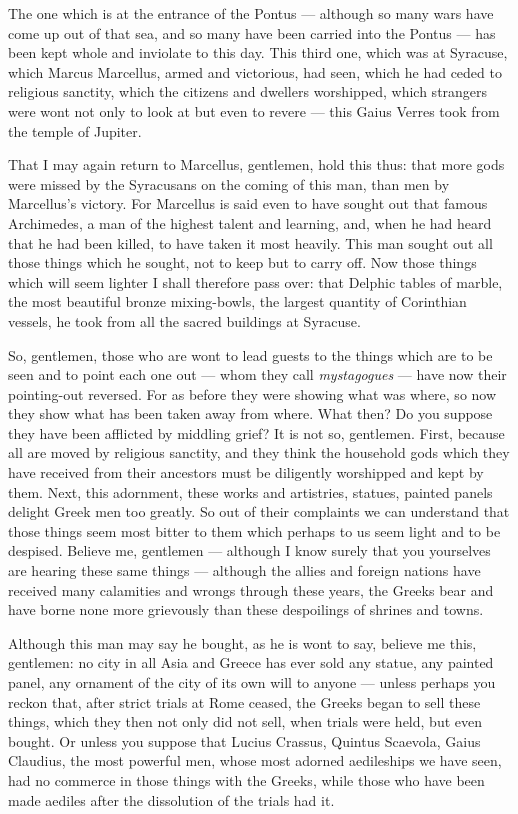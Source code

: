  The one which is at the entrance of the Pontus --- although so many wars have come up out of that sea, and so many have been carried into the Pontus --- has been kept whole and inviolate to this day. This third one, which was at Syracuse, which Marcus Marcellus, armed and victorious, had seen, which he had ceded to religious sanctity, which the citizens and dwellers worshipped, which strangers were wont not only to look at but even to revere --- this Gaius Verres took from the temple of Jupiter.

 That I may again return to Marcellus, gentlemen, hold this thus: that more gods were missed by the Syracusans on the coming of this man, than men by Marcellus's victory. For Marcellus is said even to have sought out that famous Archimedes, a man of the highest talent and learning, and, when he had heard that he had been killed, to have taken it most heavily. This man sought out all those things which he sought, not to keep but to carry off. Now those things which will seem lighter I shall therefore pass over: that Delphic tables of marble, the most beautiful bronze mixing-bowls, the largest quantity of Corinthian vessels, he took from all the sacred buildings at Syracuse.

 So, gentlemen, those who are wont to lead guests to the things which are to be seen and to point each one out --- whom they call \textit{mystagogues} --- have now their pointing-out reversed. For as before they were showing what was where, so now they show what has been taken away from where. What then? Do you suppose they have been afflicted by middling grief? It is not so, gentlemen. First, because all are moved by religious sanctity, and they think the household gods which they have received from their ancestors must be diligently worshipped and kept by them. Next, this adornment, these works and artistries, statues, painted panels delight Greek men too greatly. So out of their complaints we can understand that those things seem most bitter to them which perhaps to us seem light and to be despised. Believe me, gentlemen --- although I know surely that you yourselves are hearing these same things --- although the allies and foreign nations have received many calamities and wrongs through these years, the Greeks bear and have borne none more grievously than these despoilings of shrines and towns.

 Although this man may say he bought, as he is wont to say, believe me this, gentlemen: no city in all Asia and Greece has ever sold any statue, any painted panel, any ornament of the city of its own will to anyone --- unless perhaps you reckon that, after strict trials at Rome ceased, the Greeks began to sell these things, which they then not only did not sell, when trials were held, but even bought. Or unless you suppose that Lucius Crassus, Quintus Scaevola, Gaius Claudius, the most powerful men, whose most adorned aedileships we have seen, had no commerce in those things with the Greeks, while those who have been made aediles after the dissolution of the trials had it.

